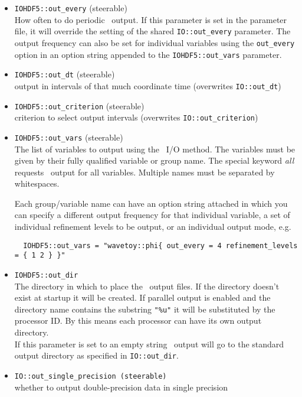 \documentclass{article}
\begin{document}
\begin{itemize}
  \item {\tt IOHDF5::out\_every} (steerable)\\
        How often to do periodic \ThisThorn\ output. If this parameter is set
        in the parameter file, it will override the setting of the shared
        {\tt IO::out\_every} parameter. The output frequency can also be set
        for individual variables using the {\tt out\_every} option in an option
        string appended to the {\tt IOHDF5::out\_vars} parameter.

  \item {\tt IOHDF5::out\_dt} (steerable)\\
        output in intervals of that much coordinate time (overwrites {\tt IO::out\_dt})

  \item {\tt IOHDF5::out\_criterion} (steerable)\\
        criterion to select output intervals (overwrites {\tt IO::out\_criterion})

  \item {\tt IOHDF5::out\_vars} (steerable)\\
        The list of variables to output using the \ThisThorn\ I/O method.
        The variables must be given by their fully qualified variable or group
        name. The special keyword {\it all} requests \ThisThorn\ output for
        all variables. Multiple names must be separated by whitespaces.

        Each group/variable name can have an option string attached in which you
        can specify a different output frequency for that individual variable,
	a set of individual refinement levels to be output, or an individual
        output mode, e.g.
\begin{verbatim}
  IOHDF5::out_vars = "wavetoy::phi{ out_every = 4 refinement_levels = { 1 2 } }"
\end{verbatim}

  \item {\tt IOHDF5::out\_dir}\\
        The directory in which to place the \ThisThorn\ output files.
        If the directory doesn't exist at startup it will be created.
        If parallel output is enabled and the directory name contains the
        substring {\tt "\%u"} it will be substituted by the processor ID.
        By this means each processor can have its own output directory.\\
        If this parameter is set to an empty string \ThisThorn\ output will go
        to the standard output directory as specified in {\tt IO::out\_dir}.

  \item {\tt IO::out\_single\_precision (steerable)}\\
        whether to output double-precision data in single precision

\end{itemize}
\end{document}
